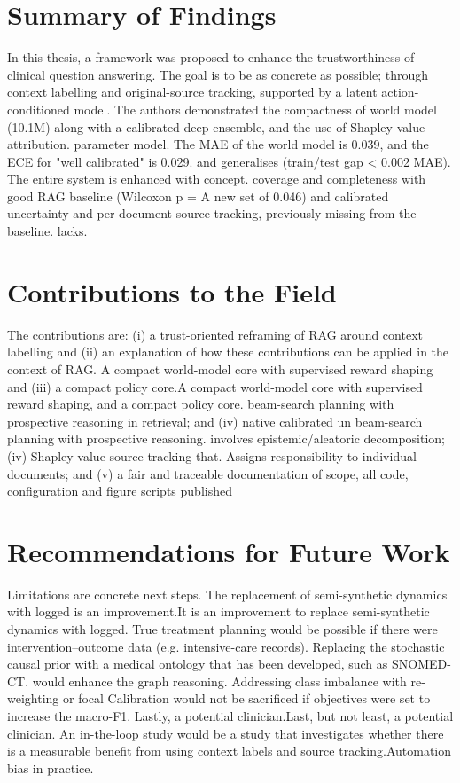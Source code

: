 \section{Summary of Findings}
In this thesis, a framework was proposed to enhance the trustworthiness of clinical question answering.
The goal is to be as concrete as possible; through context labelling and original-source tracking, supported by a latent action-conditioned model.
The authors demonstrated the compactness of world model (10.1M) along with a calibrated deep ensemble, and the use of Shapley-value attribution.
parameter model. The MAE of the world model is 0.039, and the ECE for "well calibrated" is 0.029.
and generalises (train/test gap < 0.002 MAE). The entire system is enhanced with concept.
coverage and completeness with good RAG baseline (Wilcoxon p =
A new set of 0.046) and calibrated uncertainty and per-document source tracking, previously missing from the baseline.
lacks.



\section{Contributions to the Field}
The contributions are: (i) a trust-oriented reframing of RAG around context labelling and (ii) an explanation of how these contributions can be applied in the context of RAG.
A compact world-model core with supervised reward shaping and (iii) a compact policy core.A compact world-model core with supervised reward shaping, and a compact policy core.
beam-search planning with prospective reasoning in retrieval; and (iv) native calibrated un beam-search planning with prospective reasoning.
involves epistemic/aleatoric decomposition; (iv) Shapley-value source tracking that.
Assigns responsibility to individual documents; and (v) a fair and traceable documentation of
scope, all code, configuration and figure scripts published

\section{Recommendations for Future Work}
Limitations are concrete next steps. The replacement of semi-synthetic dynamics with logged is an improvement.It is an improvement to replace semi-synthetic dynamics with logged.
True treatment planning would be possible if there were intervention–outcome data (e.g. intensive-care records).
Replacing the stochastic causal prior with a medical ontology that has been developed, such as SNOMED-CT.
would enhance the graph reasoning. Addressing class imbalance with re-weighting or focal
Calibration would not be sacrificed if objectives were set to increase the macro-F1. Lastly, a potential clinician.Last, but not least, a potential clinician.
An in-the-loop study would be a study that investigates whether there is a measurable benefit from using context labels and source tracking.Automation bias in practice.